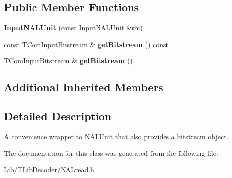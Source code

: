 \subsection*{Public Member Functions}
\begin{DoxyCompactItemize}
\item 
\mbox{\label{class_input_n_a_l_unit_a5b552d19e575a7ccfc593f36e58e8234}} 
{\bfseries Input\+N\+A\+L\+Unit} (const \hyperlink{class_input_n_a_l_unit}{Input\+N\+A\+L\+Unit} \&src)
\item 
\mbox{\label{class_input_n_a_l_unit_aa6b44dbc27ae3a26bfb7cb30c00fbd4b}} 
const \hyperlink{class_t_com_input_bitstream}{T\+Com\+Input\+Bitstream} \& {\bfseries get\+Bitstream} () const
\item 
\mbox{\label{class_input_n_a_l_unit_adcbc290e85137ac1a143591fbd3bfd6c}} 
\hyperlink{class_t_com_input_bitstream}{T\+Com\+Input\+Bitstream} \& {\bfseries get\+Bitstream} ()
\end{DoxyCompactItemize}
\subsection*{Additional Inherited Members}


\subsection{Detailed Description}
A convenience wrapper to \hyperlink{struct_n_a_l_unit}{N\+A\+L\+Unit} that also provides a bitstream object. 

The documentation for this class was generated from the following file\+:\begin{DoxyCompactItemize}
\item 
Lib/\+T\+Lib\+Decoder/\hyperlink{_n_a_lread_8h}{N\+A\+Lread.\+h}\end{DoxyCompactItemize}
